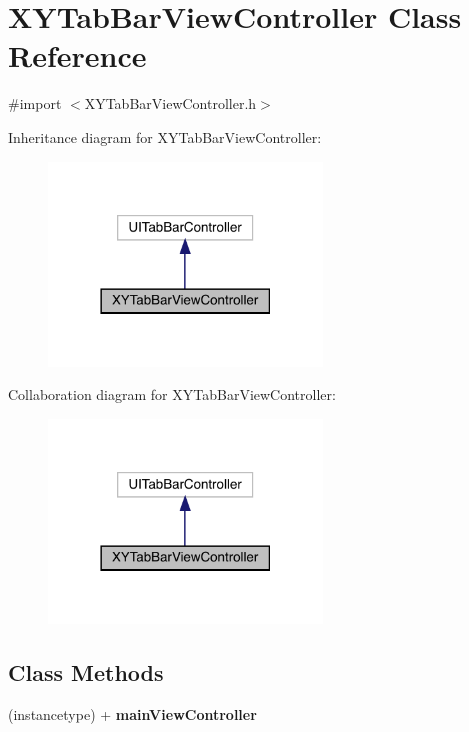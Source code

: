 \hypertarget{interface_x_y_tab_bar_view_controller}{}\section{X\+Y\+Tab\+Bar\+View\+Controller Class Reference}
\label{interface_x_y_tab_bar_view_controller}


{\ttfamily \#import $<$X\+Y\+Tab\+Bar\+View\+Controller.\+h$>$}



Inheritance diagram for X\+Y\+Tab\+Bar\+View\+Controller\+:\nopagebreak
\begin{figure}[H]
\begin{center}
\leavevmode
\includegraphics[width=206pt]{interface_x_y_tab_bar_view_controller__inherit__graph}
\end{center}
\end{figure}


Collaboration diagram for X\+Y\+Tab\+Bar\+View\+Controller\+:\nopagebreak
\begin{figure}[H]
\begin{center}
\leavevmode
\includegraphics[width=206pt]{interface_x_y_tab_bar_view_controller__coll__graph}
\end{center}
\end{figure}
\subsection*{Class Methods}
\begin{DoxyCompactItemize}
\item 
\mbox{\label{interface_x_y_tab_bar_view_controller_aa5a5c7327dd4436d7cbf71a423c5a3e8}} 
(instancetype) + {\bfseries main\+View\+Controller}
\end{DoxyCompactItemize}


